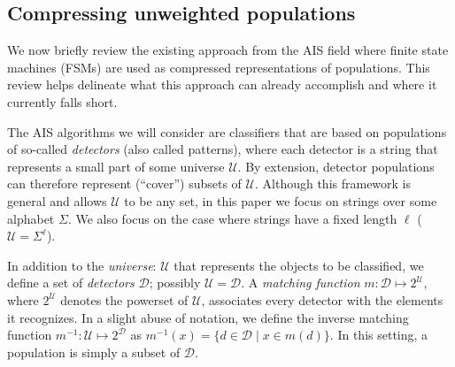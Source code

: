 \documentclass{llncs}
\begin{document}

\subsection{Compressing unweighted populations}

\label{sectionunweightedrep}

We now briefly review the existing approach from the AIS field where finite state machines
(FSMs) are used as compressed representations of populations.
This review helps %
delineate what this approach %
can already accomplish and where it currently falls short.

The AIS algorithms we will consider are classifiers 
that are based on populations of so-called 
%
\emph{detectors}
(also called patterns), where each detector is a string that represents
a small part of some universe $\mathcal{U}$. By extension, detector populations can therefore 
represent  (``cover'') subsets of $\mathcal{U}$. Although this framework is general and allows 
$\mathcal{U}$ to be any set, in this paper we focus on strings over some alphabet 
$\Sigma$. We also focus on the case where strings have a fixed length $\ell$
($\mathcal{U}=\Sigma^\ell$). 


In addition to the \emph{universe}: $\mathcal{U}$ that represents the objects to be classified, we define a set of \emph{detectors} $\mathcal{D}$; possibly $\mathcal{U}=\mathcal{D}$. A \emph{matching function} $m : \mathcal{D} \mapsto 2^\mathcal{U}$, where $2^\mathcal{U}$ denotes the powerset of $\mathcal{U}$, associates every detector with the elements it recognizes. In a slight abuse of notation, we define the inverse matching function $m^{-1} : \mathcal{U} \mapsto 2^\mathcal{D}$ as $m^{-1}(x) = \{ d \in \mathcal{D} \mid x \in m(d) \} $. In this setting, a population is simply a subset of $\mathcal{D}$. 
\end{document}
